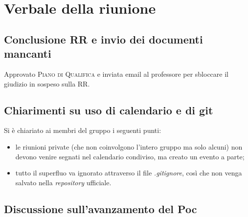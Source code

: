 \section{Verbale della riunione}

\subsection{Conclusione RR e invio dei documenti mancanti}
Approvato \textsc{Piano di Qualifica} e inviata email al professore per sbloccare il giudizio in sospeso sulla RR.

\subsection{Chiarimenti su uso di calendario e di git}
Si è chiariato ai membri del gruppo i seguenti punti:
\begin{itemize}
	\item le riunioni private (che non coinvolgono l'intero gruppo ma solo alcuni) non devono venire segnati nel calendario condiviso, ma creato un evento a parte;
	\item tutto il superfluo va ignorato attraverso il file \textit{.gitignore}, così che non venga salvato nella \textit{repository} ufficiale.
\end{itemize}

\subsection{Discussione sull'avanzamento del Poc}
